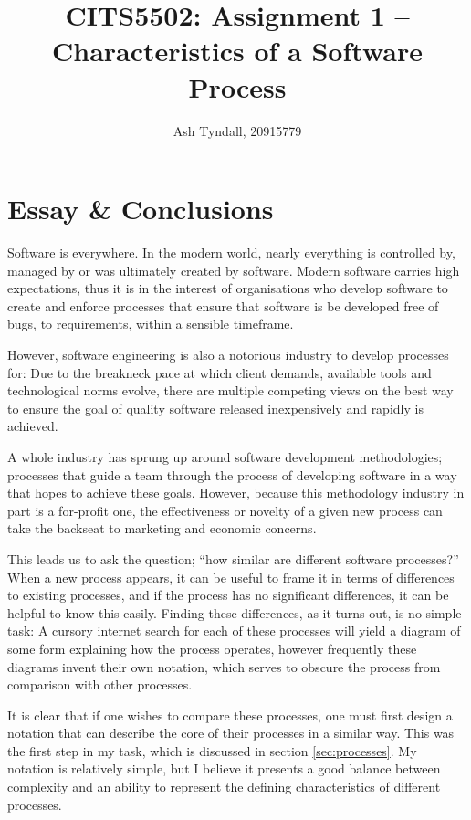 \documentclass[a4paper,10pt]{article}
\title{CITS5502: Assignment 1 -- Characteristics of a Software Process}
\author{Ash Tyndall, 20915779}
\begin{document}
\maketitle
\tableofcontents

\clearpage

\section{Essay \& Conclusions}
\fontsize{11pt}{13pt}\selectfont
Software is everywhere. In the modern world, nearly everything is controlled by, managed by or was ultimately created by software. Modern software carries high expectations, thus it is in the interest of organisations who develop software to create and enforce processes that ensure that software is be developed free of bugs, to requirements, within a sensible timeframe.

However, software engineering is also a notorious industry to develop processes for: Due to the breakneck pace at which client demands, available tools and technological norms evolve, there are multiple competing views on the best way to ensure the goal of quality software released inexpensively and rapidly is achieved.

A whole industry has sprung up around software development methodologies; processes that guide a team through the process of developing software in a way that hopes to achieve these goals. However, because this methodology industry in part is a for-profit one, the effectiveness or novelty of a given new process can take the backseat to marketing and economic concerns.

This leads us to ask the question; ``how similar are different software processes?'' When a new process appears, it can be useful to frame it in terms of differences to existing processes, and if the process has no significant differences, it can be helpful to know this easily. Finding these differences, as it turns out, is no simple task: A cursory internet search for each of these processes will yield a diagram of some form explaining how the process operates, however frequently these diagrams invent their own notation, which serves to obscure the process from comparison with other processes. 

It is clear that if one wishes to compare these processes, one must first design a notation that can describe the core of their processes in a similar way. This was the first step in my task, which is discussed in section \ref{sec:processes}. My notation is relatively simple, but I believe it presents a good balance between complexity and an ability to represent the defining characteristics of different processes.
\end{document}
